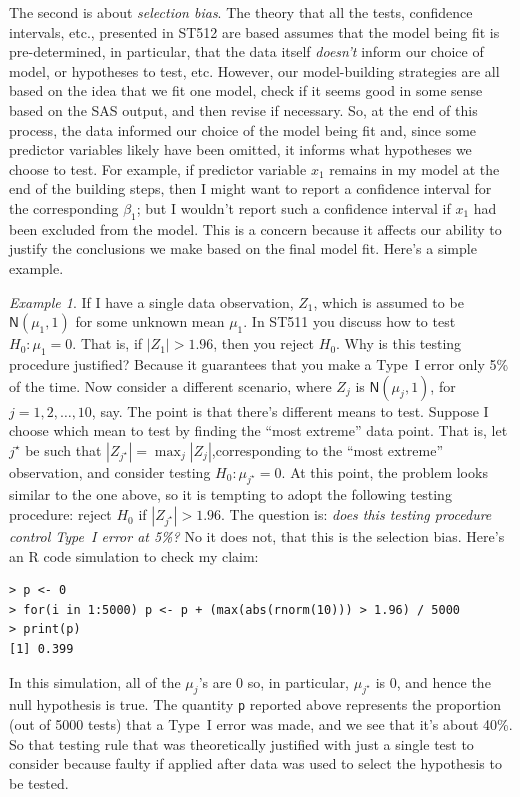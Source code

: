 \documentclass[a4paper, 12pt]{article}
\theoremstyle{plain}
\theoremstyle{definition}
\theoremstyle{remark}
\newtheorem*{example}{Example}
\newcommand{\nm}{\mathsf{N}}
\begin{document}
The second is about {\em selection bias}.  The theory that all the tests, confidence intervals, etc., presented in ST512 are based assumes that the model being fit is pre-determined, in particular, that the data itself {\em doesn't} inform our choice of model, or hypotheses to test, etc.  However, our model-building strategies are all based on the idea that we fit one model, check if it seems good in some sense based on the SAS output, and then revise if necessary.  So, at the end of this process, the data informed our choice of the model being fit and, since some predictor variables likely have been omitted, it informs what hypotheses we choose to test.  For example, if predictor variable $x_1$ remains in my model at the end of the building steps, then I might want to report a confidence interval for the corresponding $\beta_1$; but I wouldn't report such a confidence interval if $x_1$ had been excluded from the model.  This is a concern because it affects our ability to justify the conclusions we make based on the final model fit.  Here's a simple example.

\begin{example}
If I have a single data observation, $Z_1$, which is assumed to be $\nm(\mu_1,1)$ for some unknown mean $\mu_1$.  In ST511 you discuss how to test $H_0: \mu_1 = 0$.  That is, if $|Z_1| > 1.96$, then you reject $H_0$.  Why is this testing procedure justified?  Because it guarantees that you make a Type~I error only 5\% of the time.  Now consider a different scenario, where $Z_j$ is $\nm(\mu_j, 1)$, for $j=1,2,\ldots,10$, say.  The point is that there's different means to test.  Suppose I choose which mean to test by finding the ``most extreme'' data point.  That is, let $j^\star$ be such that $|Z_{j^\star}| = \max_j |Z_j|$,corresponding to the ``most extreme'' observation, and consider testing $H_0: \mu_{j^\star}=0$.  At this point, the problem looks similar to the one above, so it is tempting to adopt the following testing procedure: reject $H_0$ if $|Z_{j^\star}| > 1.96$.  The question is: {\em does this testing procedure control Type~I error at 5\%?}  No it does not, that this is the selection bias.  Here's an R code simulation to check my claim:
{\small
\begin{verbatim}
> p <- 0
> for(i in 1:5000) p <- p + (max(abs(rnorm(10))) > 1.96) / 5000
> print(p)
[1] 0.399
\end{verbatim}
}
\noindent In this simulation, all of the $\mu_j$'s are 0 so, in particular, $\mu_{j^\star}$ is 0, and hence the null hypothesis is true.  The quantity {\tt p} reported above represents the proportion (out of 5000 tests) that a Type~I error was made, and we see that it's about 40\%.  So that testing rule that was theoretically justified with just a single test to consider because faulty if applied after data was used to select the hypothesis to be tested.  
\end{example}
\end{document}
